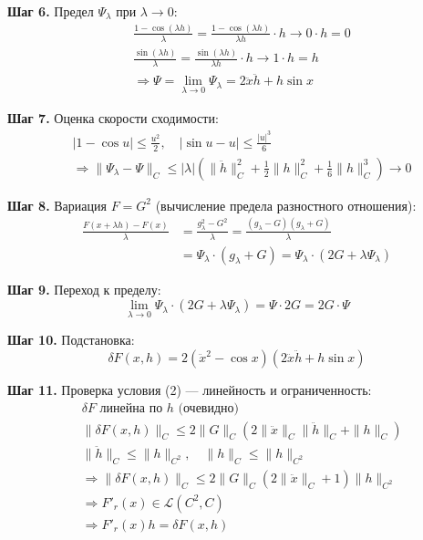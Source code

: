 \documentclass[a4paper, 12pt]{article}
\begin{document}
\textbf{Шаг 6.} Предел $\Psi_\lambda$ при $\lambda \to 0$:
\begin{align*}
& \frac{1 - \cos(\lambda h)}{\lambda} = \frac{1 - \cos(\lambda h)}{\lambda h} \cdot h \to 0 \cdot h = 0 \\
& \frac{\sin(\lambda h)}{\lambda} = \frac{\sin(\lambda h)}{\lambda h} \cdot h \to 1 \cdot h = h \\
& \Rightarrow \Psi = \lim_{\lambda \to 0} \Psi_\lambda = 2\ddot{x}\ddot{h} + h \sin x
\end{align*}

\textbf{Шаг 7.} Оценка скорости сходимости:
\begin{align*}
& |1 - \cos u| \le \frac{u^2}{2}, \quad |\sin u - u| \le \frac{|u|^3}{6} \\
& \Rightarrow \|\Psi_\lambda - \Psi\|_C \le |\lambda| \left( \|\ddot{h}\|_C^2 + \frac{1}{2}\|h\|_C^2 + \frac{1}{6}\|h\|_C^3 \right) \to 0
\end{align*}

\textbf{Шаг 8.} Вариация $F = G^2$ (вычисление предела разностного отношения):
\begin{align*}
\frac{F(x + \lambda h) - F(x)}{\lambda} &= \frac{g_\lambda^2 - G^2}{\lambda} = \frac{(g_\lambda - G)(g_\lambda + G)}{\lambda} \\
&= \Psi_\lambda \cdot (g_\lambda + G) = \Psi_\lambda \cdot (2G + \lambda \Psi_\lambda)
\end{align*}

\textbf{Шаг 9.} Переход к пределу:
\[
\lim_{\lambda \to 0} \Psi_\lambda \cdot (2G + \lambda \Psi_\lambda) = \Psi \cdot 2G = 2G \cdot \Psi
\]

\textbf{Шаг 10.} Подстановка:
\[
\delta F(x, h) = 2(\ddot{x}^2 - \cos x)(2\ddot{x}\ddot{h} + h \sin x)
\]

\textbf{Шаг 11.} Проверка условия (2) — линейность и ограниченность:
\begin{align*}
& \delta F \text{ линейна по } h \text{ (очевидно)} \\
& \|\delta F(x, h)\|_C \le 2\|G\|_C \left( 2\|\ddot{x}\|_C \|\ddot{h}\|_C + \|h\|_C \right) \\
& \|\ddot{h}\|_C \le \|h\|_{C^2}, \quad \|h\|_C \le \|h\|_{C^2} \\
& \Rightarrow \|\delta F(x, h)\|_C \le 2\|G\|_C (2\|\ddot{x}\|_C + 1) \|h\|_{C^2} \\
& \Rightarrow F'_r(x) \in \mathcal{L}(C^2, C) \\
& \Rightarrow F'_r(x)h = \delta F(x, h)
\end{align*}
\end{document}
